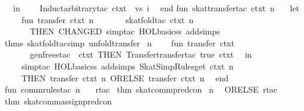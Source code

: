 \begin{isabellebody}
\ \ in\isanewline
\ \ \ \ Induct{}arbitrary{}tac\ ctxt\ {}\ vs{}\ i\isanewline
\ \ end{}\isanewline
\isanewline
fun\ skat{}transfer{}tac\ ctxt\ n\ {}\isanewline
\ \ let\isanewline
\ \ \ \ fun\ transfer{}\ ctxt\ n\ {}\isanewline
\ \ \ \ \ \ skat{}fold{}tac\ ctxt\ n\isanewline
\ \ \ \ \ \ THEN\ CHANGED\ {}simp{}tac\ {}HOL{}basic{}ss\ addsimps\ %
\isaantiq
thms\ skat{}fold{}tac{}simp\ unfold{}transfer{}%
\endisaantiq
{}\ n{}\isanewline
\ \ \ \ fun\ transfer{}\ ctxt\ {}\isanewline
\ \ \ \ \ \ gen{}frees{}tac\ {}{}\ ctxt\ THEN{}\ Transfer{}transfer{}tac\ true\ ctxt\isanewline
\ \ in\isanewline
\ \ \ \ simp{}tac\ {}HOL{}basic{}ss\ addsimps\ SkatSimpRules{}get\ ctxt{}\ n\isanewline
\ \ \ \ THEN\ {}transfer{}\ ctxt\ n\ ORELSE\ transfer{}\ ctxt\ n{}\isanewline
\ \ end\isanewline
\isanewline
fun\ comm{}rules{}tac\ n\ {}\isanewline
\ \ rtac\ %
\isaantiq
thm\ skat{}comm{}pred{}con{}%
\endisaantiq
\ n\isanewline
\ \ ORELSE\ rtac\ %
\isaantiq
thm\ skat{}comm{}assign{}pred{}con{}%

\end{isabellebody}
